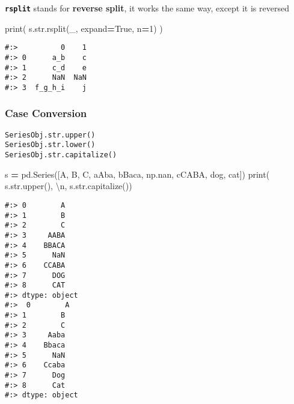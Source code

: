 \documentclass[
]{book}
\newenvironment{Shaded}{\begin{snugshade}}{\end{snugshade}}
\newcommand{\BuiltInTok}[1]{#1}
\newcommand{\CharTok}[1]{\textcolor[rgb]{0.5,0.5,0.5}{#1}}
\newcommand{\DecValTok}[1]{\textcolor[rgb]{0.06,0.06,0.06}{#1}}
\newcommand{\NormalTok}[1]{#1}
\newcommand{\OperatorTok}[1]{\textcolor[rgb]{0.43,0.43,0.43}{\textbf{#1}}}
\newcommand{\StringTok}[1]{\textcolor[rgb]{0.5,0.5,0.5}{#1}}
\newcommand{\VariableTok}[1]{\textcolor[rgb]{0,0,0}{#1}}
\begin{document}
\textbf{\texttt{rsplit}} stands for \textbf{reverse split}, it works the same way, except it is reversed

\begin{Shaded}
\begin{Highlighting}[]
\BuiltInTok{print}\NormalTok{( s.}\BuiltInTok{str}\NormalTok{.rsplit(}\StringTok{\textquotesingle{}\_\textquotesingle{}}\NormalTok{, expand}\OperatorTok{=}\VariableTok{True}\NormalTok{, n}\OperatorTok{=}\DecValTok{1}\NormalTok{) )}
\end{Highlighting}
\end{Shaded}

\begin{verbatim}
#:>          0    1
#:> 0      a_b    c
#:> 1      c_d    e
#:> 2      NaN  NaN
#:> 3  f_g_h_i    j
\end{verbatim}

\hypertarget{case-conversion}{%
\subsubsection{Case Conversion}\label{case-conversion}}

\begin{verbatim}
SeriesObj.str.upper()
SeriesObj.str.lower()
SeriesObj.str.capitalize()
\end{verbatim}

\begin{Shaded}
\begin{Highlighting}[]
\NormalTok{s }\OperatorTok{=}\NormalTok{ pd.Series([}\StringTok{\textquotesingle{}A\textquotesingle{}}\NormalTok{, }\StringTok{\textquotesingle{}B\textquotesingle{}}\NormalTok{, }\StringTok{\textquotesingle{}C\textquotesingle{}}\NormalTok{, }\StringTok{\textquotesingle{}aAba\textquotesingle{}}\NormalTok{, }\StringTok{\textquotesingle{}bBaca\textquotesingle{}}\NormalTok{, np.nan, }\StringTok{\textquotesingle{}cCABA\textquotesingle{}}\NormalTok{, }\StringTok{\textquotesingle{}dog\textquotesingle{}}\NormalTok{, }\StringTok{\textquotesingle{}cat\textquotesingle{}}\NormalTok{])}
\BuiltInTok{print}\NormalTok{( s.}\BuiltInTok{str}\NormalTok{.upper(), }\StringTok{\textquotesingle{}}\CharTok{\textbackslash{}n}\StringTok{\textquotesingle{}}\NormalTok{,}
\NormalTok{       s.}\BuiltInTok{str}\NormalTok{.capitalize())}
\end{Highlighting}
\end{Shaded}

\begin{verbatim}
#:> 0        A
#:> 1        B
#:> 2        C
#:> 3     AABA
#:> 4    BBACA
#:> 5      NaN
#:> 6    CCABA
#:> 7      DOG
#:> 8      CAT
#:> dtype: object 
#:>  0        A
#:> 1        B
#:> 2        C
#:> 3     Aaba
#:> 4    Bbaca
#:> 5      NaN
#:> 6    Ccaba
#:> 7      Dog
#:> 8      Cat
#:> dtype: object
\end{verbatim}
\end{document}
